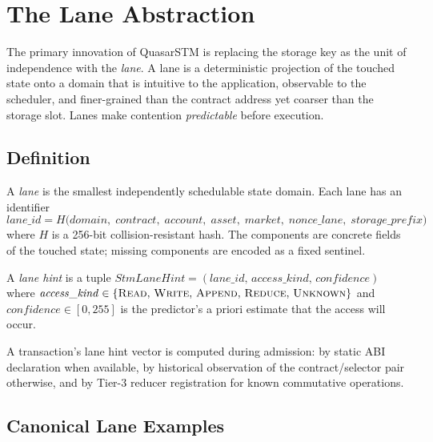 \section{The Lane Abstraction}

\label{sec:lanes}

The primary innovation of QuasarSTM is replacing the storage key as
the unit of independence with the \emph{lane}. A lane is a
deterministic projection of the touched state onto a domain that is
intuitive to the application, observable to the scheduler, and
finer-grained than the contract address yet coarser than the storage
slot. Lanes make contention \emph{predictable} before execution.

\subsection{Definition}

\begin{definition}[Lane]
\label{def:lane}
A \emph{lane} is the smallest independently schedulable state domain.
Each lane has an identifier
\[
\mathit{lane\_id} =
H\bigl(\mathit{domain},\; \mathit{contract},\; \mathit{account},\;
       \mathit{asset},\; \mathit{market},\; \mathit{nonce\_lane},\;
       \mathit{storage\_prefix}\bigr)
\]
where $H$ is a 256-bit collision-resistant hash. The components are
concrete fields of the touched state; missing components are encoded
as a fixed sentinel.
\end{definition}

\begin{definition}
\label{def:lane-hint}
A \emph{lane hint} is a tuple
$\mathit{StmLaneHint} = (\mathit{lane\_id},\, \mathit{access\_kind},\,
\mathit{confidence})$ where
$\mathit{access\_kind} \in \{\textsc{Read},\, \textsc{Write},\,
\textsc{Append},\, \textsc{Reduce},\, \textsc{Unknown}\}$ and
$\mathit{confidence} \in [0,255]$ is the predictor's a priori
estimate that the access will occur.
\end{definition}

A transaction's lane hint vector is computed during admission: by
static ABI declaration when available, by historical observation of
the contract/selector pair otherwise, and by Tier-3 reducer
registration for known commutative operations.

\subsection{Canonical Lane Examples}

